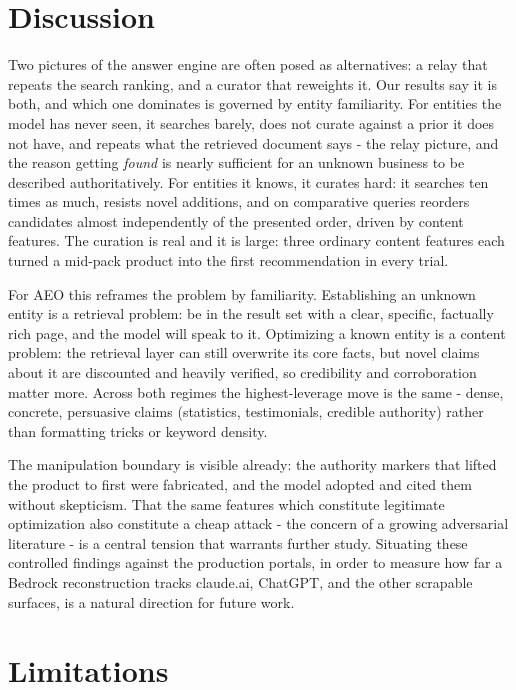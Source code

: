 \documentclass[11pt]{article}
\begin{document}
\section{Discussion}

Two pictures of the answer engine are often posed as alternatives: a relay that repeats the search
ranking, and a curator that reweights it. Our results say it is both, and which one dominates is
governed by entity familiarity. For entities the model has never seen, it searches barely, does not
curate against a prior it does not have, and repeats what the retrieved document says - the relay
picture, and the reason getting \emph{found} is nearly sufficient for an unknown business to be
described authoritatively. For entities it knows, it curates hard: it searches ten times as much,
resists novel additions, and on comparative queries reorders candidates almost independently of the
presented order, driven by content features. The curation is real and it is large: three ordinary
content features each turned a mid-pack product into the first recommendation in every trial.

For AEO this reframes the problem by familiarity. Establishing an unknown entity is a retrieval
problem: be in the result set with a clear, specific, factually rich page, and the model will speak
to it. Optimizing a known entity is a content problem: the retrieval layer can still overwrite its
core facts, but novel claims about it are discounted and heavily verified, so credibility and
corroboration matter more. Across both regimes the highest-leverage move is the same - dense,
concrete, persuasive claims (statistics, testimonials, credible authority) rather than formatting
tricks or keyword density.

The manipulation boundary is visible already: the authority markers that
lifted the product to first were fabricated, and the model adopted and cited them without
skepticism. That the same features which constitute legitimate optimization also constitute a cheap
attack - the concern of a growing adversarial literature
\citep{kumar2024manipulating,nestaas2024adversarial} - is a central tension that warrants further
study. Situating these controlled findings against the production portals, in order to measure how
far a Bedrock reconstruction tracks claude.ai, ChatGPT, and the other scrapable surfaces, is a
natural direction for future work.

\section{Limitations}
\label{sec:limitations}
\end{document}
